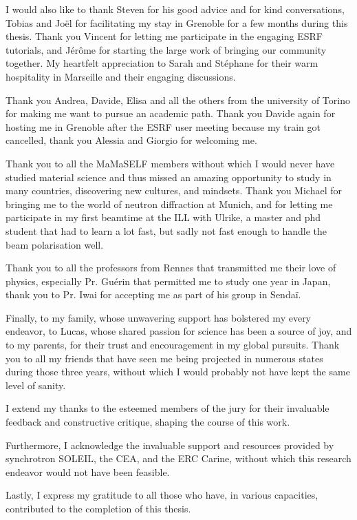 I would also like to thank Steven for his good advice and for kind conversations, Tobias and Joël for facilitating my stay in Grenoble for a few months during this thesis.
Thank you Vincent for letting me participate in the engaging ESRF tutorials, and Jérôme for starting the large work of bringing our community together.
My heartfelt appreciation to Sarah and Stéphane for their warm hospitality in Marseille and their engaging discussions.

Thank you Andrea, Davide, Elisa and all the others from the university of Torino for making me want to pursue an academic path.
Thank you Davide again for hosting me in Grenoble after the ESRF user meeting because my train got cancelled, thank you Alessia and Giorgio for welcoming me.

Thank you to all the MaMaSELF members without which I would never have studied material science and thus missed an amazing opportunity to study in many countries, discovering new cultures, and mindsets.
Thank you Michael for bringing me to the world of neutron diffraction at Munich, and for letting me participate in my first beamtime at the ILL with Ulrike, a master and phd student that had to learn a lot fast, but sadly not fast enough to handle the beam polarisation well.

Thank you to all the professors from Rennes that transmitted me their love of physics, especially Pr. Guérin that permitted me to study one year in Japan, thank you to Pr. Iwai for accepting me as part of his group in Sendaï.

Finally, to my family, whose unwavering support has bolstered my every endeavor, to Lucas, whose shared passion for science has been a source of joy, and to my parents, for their trust and encouragement in my global pursuits.
Thank you to all my friends that have seen me being projected in numerous states during those three years, without which I would probably not have kept the same level of sanity.

I extend my thanks to the esteemed members of the jury for their invaluable feedback and constructive critique, shaping the course of this work.

Furthermore, I acknowledge the invaluable support and resources provided by synchrotron SOLEIL, the CEA, and the ERC Carine, without which this research endeavor would not have been feasible.

Lastly, I express my gratitude to all those who have, in various capacities, contributed to the completion of this thesis.

\newpage
